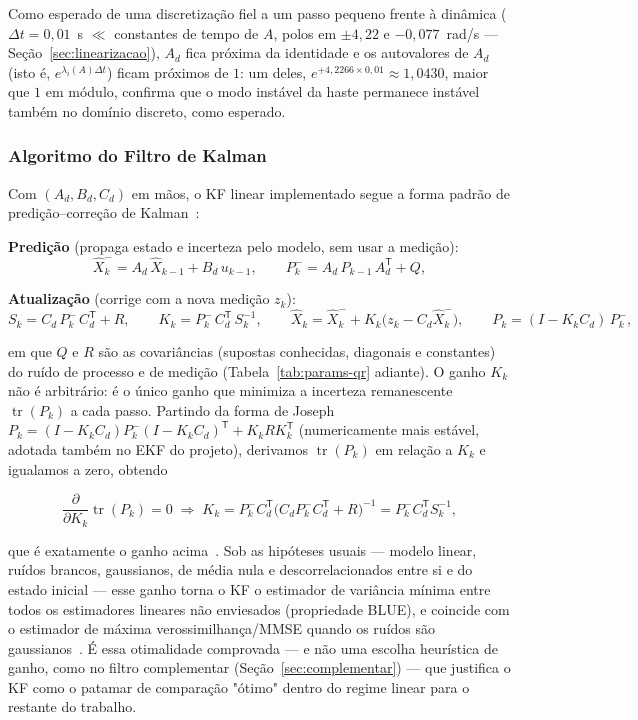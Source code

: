 \documentclass[brazil, 12pt]{article}
\begin{document}
Como esperado de uma discretização fiel a um passo pequeno frente à dinâmica
($\Delta t=0{,}01$~s $\ll$ constantes de tempo de $A$, polos em $\pm4{,}22$ e
$-0{,}077$~rad/s --- Seção~\ref{sec:linearizacao}), $A_d$ fica próxima da
identidade e os autovalores de $A_d$ (isto é, $e^{\lambda_i(A)\Delta t}$) ficam
próximos de $1$: um deles, $e^{+4{,}2266\times0{,}01}\approx1{,}0430$, maior
que $1$ em módulo, confirma que o modo instável da haste permanece instável
também no domínio discreto, como esperado.

\subsubsection{Algoritmo do Filtro de Kalman}
\label{sec:kf-algoritmo}

Com $(A_d,B_d,C_d)$ em mãos, o KF linear implementado segue a forma padrão de
predição--correção de Kalman~\cite{welch1995, simon2006}:

\medskip
\noindent\textbf{Predição} (propaga estado e incerteza pelo modelo, sem usar a medição):
\[
\hat X_{k}^{-} = A_d\,\hat X_{k-1} + B_d\,u_{k-1},
\qquad
P_{k}^{-} = A_d\,P_{k-1}\,A_d^{\mathsf T} + Q,
\]

\noindent\textbf{Atualização} (corrige com a nova medição $z_k$):
\[
S_k = C_d\,P_k^{-}\,C_d^{\mathsf T} + R,
\qquad
K_k = P_k^{-}\,C_d^{\mathsf T}\,S_k^{-1},
\qquad
\hat X_k = \hat X_k^{-} + K_k\big(z_k - C_d\hat X_k^{-}\big),
\qquad
P_k = (I - K_k C_d)\,P_k^{-},
\]

em que $Q$ e $R$ são as covariâncias (supostas conhecidas, diagonais e
constantes) do ruído de processo e de medição (Tabela~\ref{tab:params-qr}
adiante). O ganho $K_k$ não é arbitrário: é o único ganho que minimiza a
incerteza remanescente $\operatorname{tr}(P_k)$ a cada passo. Partindo da
forma de Joseph
$P_k=(I-K_kC_d)P_k^{-}(I-K_kC_d)^{\mathsf T}+K_kRK_k^{\mathsf T}$ (numericamente
mais estável, adotada também no EKF do projeto), derivamos
$\operatorname{tr}(P_k)$ em relação a $K_k$ e igualamos a zero, obtendo

\[
\frac{\partial}{\partial K_k}\operatorname{tr}(P_k) = 0
\;\Longrightarrow\;
K_k = P_k^{-}C_d^{\mathsf T}\big(C_dP_k^{-}C_d^{\mathsf T}+R\big)^{-1} = P_k^{-}C_d^{\mathsf T}S_k^{-1},
\]

que é exatamente o ganho acima~\cite{simon2006}. Sob as hipóteses usuais ---
modelo linear, ruídos brancos, gaussianos, de média nula e descorrelacionados
entre si e do estado inicial --- esse ganho torna o KF o estimador de
variância mínima entre todos os estimadores lineares não enviesados
(propriedade BLUE), e coincide com o estimador de máxima verossimilhança/MMSE
quando os ruídos são gaussianos~\cite{simon2006}. É essa otimalidade
comprovada --- e não uma escolha heurística de ganho, como no filtro
complementar (Seção~\ref{sec:complementar}) --- que justifica o KF como o
patamar de comparação "ótimo" dentro do regime linear para o restante do
trabalho.
\end{document}
